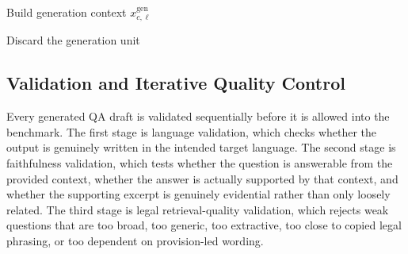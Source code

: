 \begin{algorithm}[t]
\caption{Generation and validation loop for one JRC generation instance}
\label{alg:jrc-generation-loop}
\DontPrintSemicolon
{}

Build generation context $x^{\mathrm{gen}}_{c,\ell}$\;


Discard the generation unit\;
\end{algorithm}

\subsection{Validation and Iterative Quality Control}

Every generated QA draft is validated sequentially before it is allowed into the benchmark. The first stage is language validation, which checks whether the output is genuinely written in the intended target language. The second stage is faithfulness validation, which tests whether the question is answerable from the provided context, whether the answer is actually supported by that context, and whether the supporting excerpt is genuinely evidential rather than only loosely related. The third stage is legal retrieval-quality validation, which rejects weak questions that are too broad, too generic, too extractive, too close to copied legal phrasing, or too dependent on provision-led wording.

